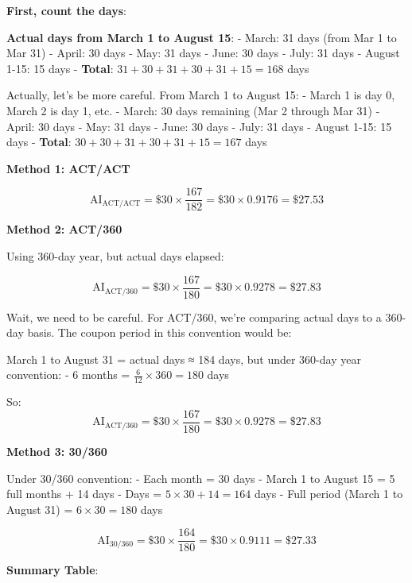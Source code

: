 \documentclass[
  letterpaper,
]{scrbook}
\begin{document}
\begin{tcolorbox}[enhanced jigsaw, toptitle=1mm, colbacktitle=quarto-callout-tip-color!10!white, opacityback=0, leftrule=.75mm, breakable, colframe=quarto-callout-tip-color-frame, toprule=.15mm, opacitybacktitle=0.6, coltitle=black, bottomrule=.15mm, colback=white, arc=.35mm, titlerule=0mm, rightrule=.15mm, left=2mm, title={Click to reveal solution}, bottomtitle=1mm]

\textbf{First, count the days}:

\textbf{Actual days from March 1 to August 15}: - March: 31 days (from
Mar 1 to Mar 31) - April: 30 days - May: 31 days - June: 30 days - July:
31 days - August 1-15: 15 days - \textbf{Total}:
\(31 + 30 + 31 + 30 + 31 + 15 = 168\) days

Actually, let's be more careful. From March 1 to August 15: - March 1 is
day 0, March 2 is day 1, etc. - March: 30 days remaining (Mar 2 through
Mar 31) - April: 30 days - May: 31 days - June: 30 days - July: 31 days
- August 1-15: 15 days - \textbf{Total}:
\(30 + 30 + 31 + 30 + 31 + 15 = 167\) days

\textbf{Method 1: ACT/ACT}

\[
\text{AI}_{\text{ACT/ACT}} = \$30 \times \frac{167}{182} = \$30 \times 0.9176 = \$27.53
\]

\textbf{Method 2: ACT/360}

Using 360-day year, but actual days elapsed:

\[
\text{AI}_{\text{ACT/360}} = \$30 \times \frac{167}{180} = \$30 \times 0.9278 = \$27.83
\]

Wait, we need to be careful. For ACT/360, we're comparing actual days to
a 360-day basis. The coupon period in this convention would be:

March 1 to August 31 = actual days ≈ 184 days, but under 360-day year
convention: - 6 months = \(\frac{6}{12} \times 360 = 180\) days

So: \[
\text{AI}_{\text{ACT/360}} = \$30 \times \frac{167}{180} = \$30 \times 0.9278 = \$27.83
\]

\textbf{Method 3: 30/360}

Under 30/360 convention: - Each month = 30 days - March 1 to August 15 =
5 full months + 14 days - Days = \(5 \times 30 + 14 = 164\) days - Full
period (March 1 to August 31) = \(6 \times 30 = 180\) days

\[
\text{AI}_{30/360} = \$30 \times \frac{164}{180} = \$30 \times 0.9111 = \$27.33
\]

\textbf{Summary Table}:


\end{tcolorbox}
\end{document}
